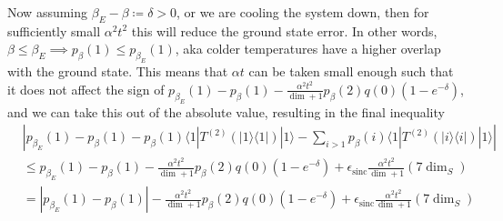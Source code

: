 \documentclass{article}
\newcommand{\ket}[1]{|#1\rangle}
\newcommand{\bra}[1]{\langle #1|}
\newcommand{\ketbra}[2]{| #1\rangle\! \langle #2|}
\DeclareMathOperator{\sinc}{sinc}
\begin{document}
Now assuming $\beta_E - \beta \coloneqq \delta > 0$, or we are cooling the system down, then for sufficiently small $\alpha^2 t^2$ this will reduce the ground state error. In other words, $\beta \leq \beta_E \implies p_{\beta}(1) \leq p_{\beta_E}(1)$, aka colder temperatures have a higher overlap with the ground state. This means that $\alpha t$ can be taken small enough such that it does not affect the sign of $p_{\beta_E}(1) - p_{\beta}(1) - \frac{\alpha^2 t^2}{\dim + 1} p_{\beta}(2) q(0) (1 - e^{-\delta})$, and we can take this out of the absolute value, resulting in the final inequality
\begin{align}
    &\left| p_{\beta_E}(1) - p_{\beta}(1) - p_{\beta}(1) \bra{1} T^{(2)}(\ketbra{1}{1})\ket{1} - \sum_{i > 1} p_{\beta}(i) \bra{1} T^{(2)}(\ketbra{i}{i})\ket{1} \right| \\
    &\leq p_{\beta_E}(1) - p_{\beta}(1) - \frac{\alpha^2 t^2}{\dim + 1} p_{\beta}(2) q(0)(1 - e^{-\delta}) + \epsilon_{\sinc} \frac{\alpha^2 t^2}{\dim + 1} (7 \dim_S) \\
    &= \left| p_{\beta_E}(1) - p_{\beta}(1)\right| - \frac{\alpha^2 t^2}{\dim + 1} p_{\beta}(2) q(0)(1 - e^{-\delta}) + \epsilon_{\sinc} \frac{\alpha^2 t^2}{\dim + 1} (7 \dim_S)
\end{align}
\end{document}

